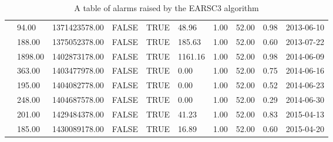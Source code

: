 \begin{table}[ht]
\begin{adjustwidth}{-2cm}{}
\begin{tabular}{llllllllll}
 & 94.00 & 1371423578.00 & FALSE & TRUE & 48.96 & 1.00 & 52.00 & 0.98 & 2013-06-10 \\ 
 & 188.00 & 1375052378.00 & FALSE & TRUE & 185.63 & 1.00 & 52.00 & 0.60 & 2013-07-22 \\ 
 & 1898.00 & 1402873178.00 & FALSE & TRUE & 1161.16 & 1.00 & 52.00 & 0.98 & 2014-06-09 \\ 
 & 363.00 & 1403477978.00 & FALSE & TRUE & 0.00 & 1.00 & 52.00 & 0.75 & 2014-06-16 \\ 
 & 195.00 & 1404082778.00 & FALSE & TRUE & 0.00 & 1.00 & 52.00 & 0.52 & 2014-06-23 \\ 
 & 248.00 & 1404687578.00 & FALSE & TRUE & 0.00 & 1.00 & 52.00 & 0.29 & 2014-06-30 \\ 
 & 201.00 & 1429484378.00 & FALSE & TRUE & 41.23 & 1.00 & 52.00 & 0.83 & 2015-04-13 \\ 
 & 185.00 & 1430089178.00 & FALSE & TRUE & 16.89 & 1.00 & 52.00 & 0.60 & 2015-04-20 \\ 
   \hline
\end{tabular}
\caption{A table of alarms raised by the EARSC3 algorithm}
\end{adjustwidth}
\label{tab:tseriesEARSC3RADtable}
\end{table}



